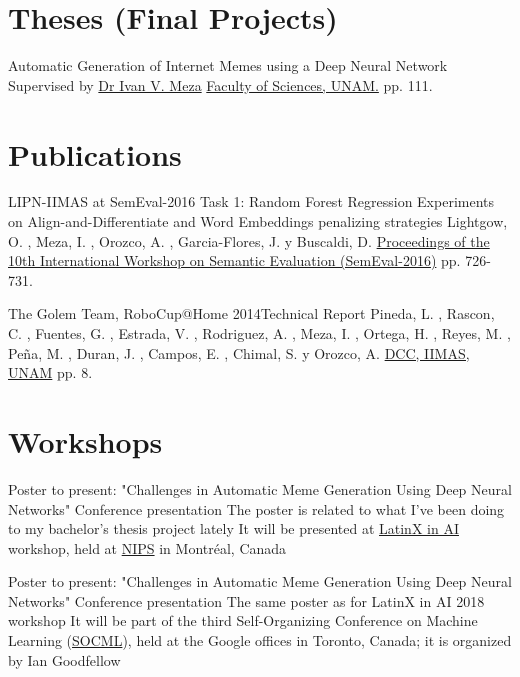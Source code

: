 \documentclass[10pt,a4paper,sans]{moderncv} %
\begin{document}
\section{Theses (Final Projects)}

        {Automatic Generation of Internet Memes using a Deep Neural Network}
        {Supervised by \href{http://turing.iimas.unam.mx/~ivanvladimir/}{Dr Ivan V. Meza}}
        {}{}
        {\href{http://132.248.9.195/ptd2018/febrero/0770173/}{Faculty of Sciences, UNAM.} pp. 111.}

\section{Publications}

        {LIPN-IIMAS at SemEval-2016 Task 1: Random Forest Regression Experiments on Align-and-Differentiate and Word Embeddings penalizing strategies}
        {}{}{}
        {Lightgow, O. , Meza, I. , Orozco, A. , Garcia-Flores, J. y Buscaldi, D.
         \href{https://www.aclweb.org/anthology/S/S16/S16-1112.pdf}{Proceedings of the 10th International Workshop on Semantic Evaluation (SemEval-2016)} pp. 726-731.}

        {The Golem Team, RoboCup@Home 2014}{Technical Report}
        {}{}
        {Pineda, L. , Rascon, C. , Fuentes, G. , Estrada, V. , Rodriguez, A. , Meza, I. , Ortega, H. ,
         Reyes, M. , Peña, M. , Duran, J. , Campos, E. , Chimal, S. y Orozco, A.
        \href{http://golem.iimas.unam.mx/pubs/tdp_Golem-II+_2014.pdf}{DCC, IIMAS, UNAM} pp. 8.}

\section{Workshops}

        {Poster to present: "Challenges in Automatic Meme Generation Using Deep Neural Networks"}
        {Conference presentation}
        {The poster is related to what I've been doing to my bachelor's thesis project lately}
        {It will be presented at \href{http://www.latinxinai.org}{LatinX in AI} workshop,
          held at \href{https://nips.cc}{NIPS} in Montréal, Canada}
        {}

        {Poster to present: "Challenges in Automatic Meme Generation Using Deep Neural Networks"}
        {Conference presentation}
        {The same poster as for LatinX in AI 2018 workshop}
        {It will be part of the third Self-Organizing Conference on Machine Learning (\href{https://sites.google.com/view/socml-2018/home}{SOCML}),
          held at the Google offices in Toronto, Canada; it is organized by Ian Goodfellow}
        {}
\end{document}
